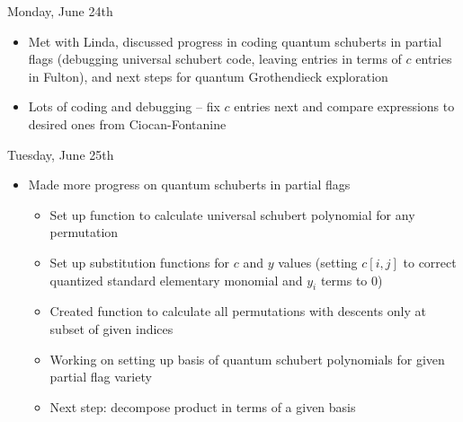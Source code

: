 Monday, June 24th
\begin{itemize}
    \item Met with Linda, discussed progress in coding quantum schuberts in partial flags (debugging universal schubert code, leaving entries in terms of $c$ entries in Fulton), and next steps for quantum Grothendieck exploration
    \item Lots of coding and debugging -- fix $c$ entries next and compare expressions to desired ones from Ciocan-Fontanine
\end{itemize}

Tuesday, June 25th
\begin{itemize}
    \item Made more progress on quantum schuberts in partial flags
    \begin{itemize}
        \item Set up function to calculate universal schubert polynomial for any permutation
        \item Set up substitution functions for $c$ and $y$ values (setting $c[i, j]$ to correct quantized standard elementary monomial and $y_i$ terms to $0$)
        \item Created function to calculate all permutations with descents only at subset of given indices
        \item Working on setting up basis of quantum schubert polynomials for given partial flag variety
        \item Next step: decompose product in terms of a given basis
    \end{itemize}
\end{itemize}
